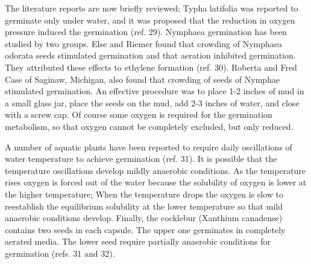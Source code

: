 The literature reports are now briefly reviewed; Typha latifolia was reported to
germinate only under water, and it was proposed that the reduction in oxygen
pressure induced the germination (ref. 29). Nymphaea germination has been studied
by two groups. Else and Riemer found that crowding of Nymphaea odorata seeds
stimulated germination and that aeration inhibited germination. They attributed these
effects to ethylene formation (ref. 30). Roberta and Fred Case of Saginaw, Michigan,
also found that crowding of seeds of Nymphae stimulated germination. An effective
procedure was to place 1-2 inches of mud in a small glass jar, place the seeds on the
mud, add 2-3 inches of water, and close with a screw cap. Of course some oxygen is
required for the germination metabolism, so that oxygen cannot be completely
excluded, but only reduced.

A number of aquatic plants have been reported to require daily oscillations of
water temperature to achieve germination (ref. 31). It is possible that the temperature
oscillations develop mildly anaerobic conditions. As the temperature rises oxygen is
forced out of the water because the solubility of oxygen is lower at the higher
temperature; When the temperature drops the oxygen is slow to reestablish the
equilibrium solubility at the lower temperature so that mild anaerobic conditions
develop. Finally, the cocklebur (Xanthium canadense) contains two seeds in each
capsule. The upper one germinates in completely aerated media. The lower seed
require partially anaerobic conditions for germination (refs. 31 and 32).

